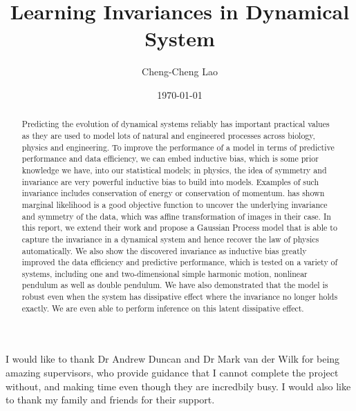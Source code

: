 \documentclass{statsmsc}
\title{Learning Invariances in Dynamical System}
\author{Cheng-Cheng Lao}
\date{\today}
\begin{document}
\maketitle


\declarationdate{\today}
\declaration 


\begin{abstract}
Predicting the evolution of dynamical systems reliably has important practical values as they are used to model lots of natural and engineered processes across biology, physics and engineering.
To improve the performance of a model in terms of predictive performance and data efficiency, we can embed inductive bias, which is some prior knowledge we have, into our statistical models; in physics, the idea of symmetry and invariance are very powerful inductive bias to build into models.
Examples of such invariance includes conservation of energy or conservation of momentum.
\cite{Mark2017} has shown marginal likelihood is a good objective function to uncover the underlying invariance and symmetry of the data, which was affine transformation of images in their case. 
In this report, we extend their work and propose a Gaussian Process model that is able to capture the invariance in a dynamical system and hence recover the law of physics automatically.
We also show the discovered invariance as inductive bias greatly improved the data efficiency and predictive performance, which is tested on a variety of systems, including one and two-dimensional simple harmonic motion, nonlinear pendulum as well as double pendulum.
We have also demonstrated that the model is robust even when the system has dissipative effect where the invariance no longer holds exactly. 
We are even able to perform inference on this latent dissipative effect.
\end{abstract}

\begin{acknowledgements}
I would like to thank Dr Andrew Duncan and Dr Mark van der Wilk for being amazing supervisors, who provide guidance that I cannot complete the project without, and making time even though they are incredbily busy. 
I would also like to thank my family and friends for their support.

\end{acknowledgements}


\mainmatter
\tableofcontents
\end{document}

